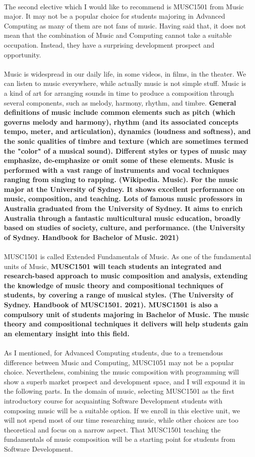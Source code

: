 \documentclass{article}
\begin{document}
	\\
	The second elective which I would like to recommend is MUSC1501 from Music major. It may not be a popular choice for students majoring in Advanced Computing as many of them are not fans of music. Having said that, it does not mean that the combination of Music and Computing cannot take a suitable occupation. Instead, they have a surprising development prospect and opportunity.\\
	\\
	Music is widespread in our daily life, in some videos, in films, in the theater. We can listen to music everywhere, while actually music is not simple stuff. Music is a kind of art for arranging sounds in time to produce a composition through several components, such as melody, harmony, rhythm, and timbre. \textbf{General definitions of music include common elements such as pitch (which governs melody and harmony), rhythm (and its associated concepts tempo, meter, and articulation), dynamics (loudness and softness), and the sonic qualities of timbre and texture (which are sometimes termed the "color" of a musical sound). Different styles or types of music may emphasize, de-emphasize or omit some of these elements. Music is performed with a vast range of instruments and vocal techniques ranging from singing to rapping. (Wikipedia. Music).  For the music major at the University of Sydney. It shows excellent performance on music, composition, and teaching. Lots of famous music professors in Australia graduated from the University of Sydney. It aims to enrich Australia through a fantastic multicultural music education, broadly based on studies of society, culture, and performance. (the University of Sydney. Handbook for Bachelor of Music. 2021)}\\
	\\
	MUSC1501 is called Extended Fundamentals of Music. As one of the fundamental units of Music, \textbf{MUSC1501 will teach students an integrated and research-based approach to music composition and analysis, extending the knowledge of music theory and compositional techniques of students, by covering a range of musical styles. (The University of Sydney. Handbook of MUSC1501. 2021). MUSC1501 is also a compulsory unit of students majoring in Bachelor of Music. The music theory and compositional techniques it delivers will help students gain an elementary insight into this field.}\\
	\\
	As I mentioned, for Advanced Computing students, due to a tremendous difference between Music and Computing, MUSC1051 may not be a popular choice. Nevertheless, combining the music composition with programming will show a superb market prospect and development space, and I will expound it in the following parts. In the domain of music, selecting MUSC1501 as the first introductory course for acquainting Software Development students with composing music will be a suitable option. If we enroll in this elective unit, we will not spend most of our time researching music, while other choices are too theoretical and focus on a narrow aspect. That MUSC1501 teaching the fundamentals of music composition will be a starting point for students from Software Development.\\
\end{document}
